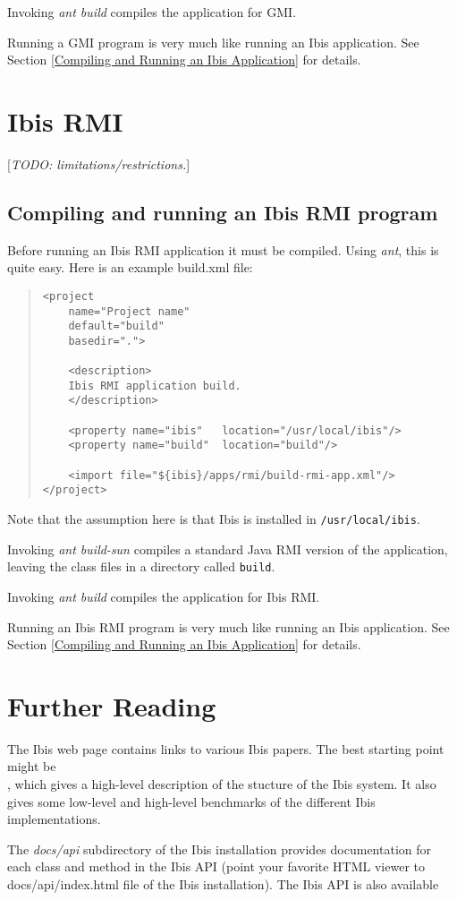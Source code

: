 \documentclass[10pt]{article}
\newcommand{\mysection}[1]{\section{#1}\label{#1}}
\newcommand{\mysubsection}[1]{\subsection{#1}\label{#1}}
\newcommand{\remark}[1]{[\emph{#1}]}
\begin{document}
Invoking \emph{ant build} compiles the application for GMI.

Running a GMI program is very much like running an Ibis application.
See Section \ref{Compiling and Running an Ibis Application} for details.

\mysection{Ibis RMI}

\remark{TODO: limitations/restrictions.}

\mysubsection{Compiling and running an Ibis RMI program}

Before running an Ibis RMI application it must be compiled.
Using \emph{ant}, this is quite easy. Here is an example build.xml file:

\begin{quote}
\begin{verbatim}
<project
    name="Project name"
    default="build"
    basedir=".">

    <description>
    Ibis RMI application build.
    </description>

    <property name="ibis"   location="/usr/local/ibis"/>
    <property name="build"  location="build"/>

    <import file="${ibis}/apps/rmi/build-rmi-app.xml"/>
</project>
\end{verbatim}
\end{quote}
Note that the assumption here is that Ibis is installed in
\texttt{/usr/local/ibis}.

Invoking \emph{ant build-sun} compiles a standard Java RMI version of
the application, leaving the class files in a directory called \texttt{build}.

Invoking \emph{ant build} compiles the application for Ibis RMI.

Running an Ibis RMI program is very much like running an Ibis application.
See Section \ref{Compiling and Running an Ibis Application} for details.

\mysection{Further Reading}

The Ibis web page
{}
{}
contains links to various Ibis papers.
The best starting point might be \\
{}
{}, which gives a high-level description of the stucture of the Ibis system.
It also gives some low-level and high-level benchmarks of the different Ibis implementations.

The \emph{docs/api} subdirectory of the Ibis installation provides
documentation for each class and method in the Ibis API (point your favorite
HTML viewer to docs/api/index.html file of the Ibis installation).
The Ibis API is also available
\end{document}
